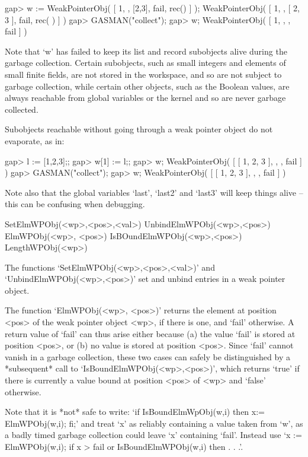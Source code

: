 \beginexample
gap> w := WeakPointerObj( [ 1, , [2,3], fail, rec() ] );
WeakPointerObj( [ 1, , [ 2, 3 ], fail, rec(  ) ] )
gap> GASMAN("collect");
gap> w;
WeakPointerObj( [ 1, , , fail ] )
\endexample

Note that `w' has failed to keep its  list and record subobjects alive during
the garbage    collection.  Certain subobjects, such  as   small integers and
elements of small finite fields, are not stored in  the workspace, and so are
not subject  to garbage collection, while certain  other objects, such as the
Boolean values, are always reachable from  global variables or the kernel and
so are never garbage collected.

Subobjects reachable without  going  through  a weak  pointer object  do  not
evaporate, as in:

\beginexample
gap> l := [1,2,3];;
gap> w[1] := l;;
gap> w;
WeakPointerObj( [ [ 1, 2, 3 ], , , fail ] )
gap> GASMAN("collect");
gap> w;                
WeakPointerObj( [ [ 1, 2, 3 ], , , fail ] )
\endexample

Note also  that the global  variables  `last', `last2' and `last3'  will keep
things alive -- this can be confusing when debugging.


\>SetElmWPObj(<wp>,<pos>,<val>)
\>UnbindElmWPObj(<wp>,<pos>)
\>ElmWPObj(<wp>, <pos>)
\>IsBOundElmWPObj(<wp>,<pos>)
\>LengthWPObj(<wp>)

The          functions           `SetElmWPObj(<wp>,<pos>,<val>)'          and
`UnbindElmWPObj(<wp>,<pos>)' set and unbind entries in a weak pointer object.

The function `ElmWPObj(<wp>, <pos>)' returns the element at position <pos> of
the weak pointer object <wp>, if there is one, and `fail' otherwise. A return
value of `fail' can thus arise either because (a)  the value `fail' is stored
at position <pos>, or (b) no value is stored  at position <pos>. Since `fail'
cannot   vanish in  a  garbage collection,   these   two cases can  safely be
distinguished by  a *subsequent* call to `IsBoundElmWPObj(<wp>,<pos>)', which
returns `true' if there is currently a value bound at  position <pos> of <wp>
and `false' otherwise.

Note that it  is  *not*  safe to write:   `if IsBoundElmWpObj(w,i)  then  x:=
ElmWPObj(w,i); fi;'  and treat `x' as  reliably containing a value taken from
`w', as a badly  timed garbage collection could  leave `x' containing `fail'. 
Instead use `x := ElmWPObj(w,i); if x \<> fail or IsBoundElmWPObj(w,i) then . 
. .'.

